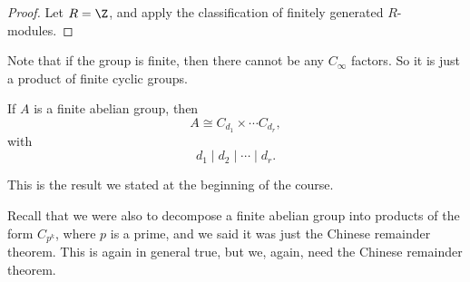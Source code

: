 \documentclass[a4paper]{article}
\begin{document}
\begin{proof}
  Let $R = \Z$, and apply the classification of finitely generated $R$-modules.
\end{proof}

Note that if the group is finite, then there cannot be any $C_\infty$ factors. So it is just a product of finite cyclic groups.
\begin{cor}
  If $A$ is a finite abelian group, then
  \[
    A \cong C_{d_1} \times \cdots C_{d_r},
  \]
  with
  \[
    d_1 \mid d_2 \mid \cdots \mid d_r.
  \]
\end{cor}
This is the result we stated at the beginning of the course.

Recall that we were also to decompose a finite abelian group into products of the form $C_{p^k}$, where $p$ is a prime, and we said it was just the Chinese remainder theorem. This is again in general true, but we, again, need the Chinese remainder theorem.
\end{document}
